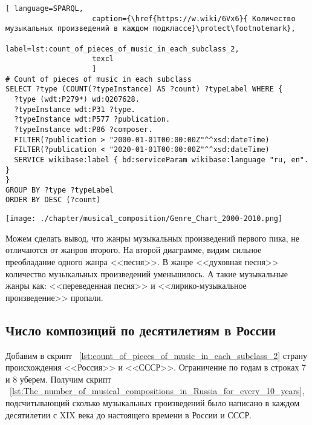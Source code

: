\begin{lstlisting}[ language=SPARQL,
                    caption={\href{https://w.wiki/6Vx6}{ Количество музыкальных произведений в каждом подклассе}\protect\footnotemark},
                    label=lst:count_of_pieces_of_music_in_each_subclass_2,
                    texcl 
                    ]
# Count of pieces of music in each subclass
SELECT ?type (COUNT(?typeInstance) AS ?count) ?typeLabel WHERE {
  ?type (wdt:P279*) wd:Q207628.
  ?typeInstance wdt:P31 ?type.
  ?typeInstance wdt:P577 ?publication.
  ?typeInstance wdt:P86 ?composer.
  FILTER(?publication > "2000-01-01T00:00:00Z"^^xsd:dateTime)        
  FILTER(?publication < "2020-01-01T00:00:00Z"^^xsd:dateTime)
  SERVICE wikibase:label { bd:serviceParam wikibase:language "ru, en". }
}
GROUP BY ?type ?typeLabel
ORDER BY DESC (?count)
\end{lstlisting}%

\begin{marginfigure}[0\baselineskip]
	\texttt{[image: ./chapter/musical\_composition/Genre\_Chart\_2000-2010.png]}
	\caption[Круговая диаграмма музыкальных жанров за 2000-2010 годы во всем мире]{Круговая диаграмма музыкальных жанров за 2000-2010 годы во всем мире. Ссылка на SPARQL-запрос: \href{https://w.wiki/6Vx6}{https://w.wiki/6Vx6}.}%
	\label{fig:Genre_Chart_2000_—_2010}%
\end{marginfigure}

Можем сделать вывод, что жанры музыкальных произведений первого пика, не отличаются от жанров второго. На второй диаграмме, видим сильное преобладание одного жанра <<песня>>. В жанре <<духовная песня>> количество музыкальных произведений уменьшилось. А такие музыкальные жанры как: <<переведенная песня>> и <<лирико-музыкальное произведение>> пропали.

\subsection{Число композиций по десятилетиям в России}
Добавим в скрипт ~\ref{lst:count_of_pieces_of_music_in_each_subclass_2} страну происхождения <<Россия>> и <<СССР>>. Ограничение по годам в строках 7 и 8 уберем. Получим скрипт ~\ref{lst:The_number_of_musical_compositions_in_Russia_for_every_10_years}, подсчитывающий сколько музыкальных произведений было написано в каждом десятилетии с XIX века до настоящего времени в России и СССР.

